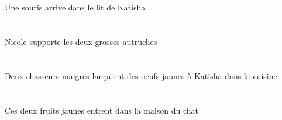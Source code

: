 \begin{exe}
\INDSgAbsP{}   \sourisASgAbsP{}    \DEFSgOblP{}    \INDSgOblP{}   \KatishaASgOblP{}   \DEP{}   \litDSgOblP{}   \DANSP{}  \arriverViPrsASgP{}\\
\INDSgAbsG{}   \sourisASgAbsG{}    \DEFSgOblG{}    \INDSgOblG{}   \KatishaASgOblG{}   \DEG{}   \litDSgOblG{}   \DANSG{}  \arriverViPrsASgG{}\\
Une souris arrive dans le lit de Katisha
\ex\glll
\INDSgErg{}   \NicoleDSgErg{}   \DEFDuAbs{}   \grosDDu{}   \autrucheDDuAbs{}  \supporterVtPrsDDu{}\\
\INDSgErgP{}   \NicoleDSgErgP{}   \DEFDuAbsP{}   \grosDDuP{}   \autrucheDDuAbsP{}  \supporterVtPrsDDuP{}\\
\INDSgErgG{}   \NicoleDSgErgG{}   \DEFDuAbsG{}   \grosDDuG{}   \autrucheDDuAbsG{}  \supporterVtPrsDDuG{}\\
Nicole supporte les deux grosses autruches
\ex\glll
\DEFSgObl{}   \cuisineCSgObl{}   \DANS{}   \INDDuErg{}   \maigreCDu{}   \chasseurCDuErg{}    \INDSgDat{}   \KatishaASgDat{}   \INDPlAbs{}   \jauneDPl{}   \oeufDPlAbs{}  \lancerVdPstDPl{}\\
\DEFSgOblP{}   \cuisineCSgOblP{}   \DANSP{}   \INDDuErgP{}   \maigreCDuP{}   \chasseurCDuErgP{}    \INDSgDatP{}   \KatishaASgDatP{}   \INDPlAbsP{}   \jauneDPlP{}   \oeufDPlAbsP{}  \lancerVdPstDPlP{}\\
\DEFSgOblG{}   \cuisineCSgOblG{}   \DANSG{}   \INDDuErgG{}   \maigreCDuG{}   \chasseurCDuErgG{}    \INDSgDatG{}   \KatishaASgDatG{}   \INDPlAbsG{}   \jauneDPlG{}   \oeufDPlAbsG{}  \lancerVdPstDPlG{}\\
Deux chasseurs maigres lançaient des oeufs jaunes à Katisha dans la cuisine
\ex\glll
\DEMDuAbs{}   \jauneBDu{}   \fruitBDuAbs{}    \DEFSgObl{}    \DEFSgObl{}   \chatDSgObl{}   \DE{}   \maisonDSgObl{}   \DANS{}  \entrerViPrsBDu{}\\
\DEMDuAbsP{}   \jauneBDuP{}   \fruitBDuAbsP{}    \DEFSgOblP{}    \DEFSgOblP{}   \chatDSgOblP{}   \DEP{}   \maisonDSgOblP{}   \DANSP{}  \entrerViPrsBDuP{}\\
\DEMDuAbsG{}   \jauneBDuG{}   \fruitBDuAbsG{}    \DEFSgOblG{}    \DEFSgOblG{}   \chatDSgOblG{}   \DEG{}   \maisonDSgOblG{}   \DANSG{}  \entrerViPrsBDuG{}\\
Ces deux fruits jaunes entrent dans la maison du chat
\ex\glll
\DEFDuAbs{}   \infirmiereBDuAbs{}    \DEFSgObl{}    \DEFSgObl{}   \chasseurCSgObl{}   \DE{}   \chambreBSgObl{}   \DANS{}  \arriverViPrsBDu{}\\
\DEFDuAbsP{}   \infirmiereBDuAbsP{}    \DEFSgOblP{}    \DEFSgOblP{}   \chasseurCSgOblP{}   \DEP{}   \chambreBSgOblP{}   \DANSP{}  \arriverViPrsBDuP{}\\

\end{exe}
